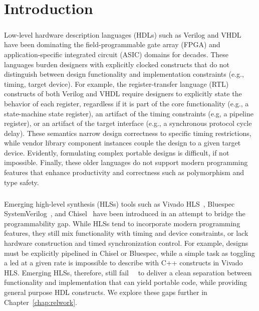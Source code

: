 \chapter{Introduction}
\label{chap:intro}
\paragraph{}Low-level hardware description languages (HDLs) such as Verilog and VHDL have been dominating the field-programmable gate array (FPGA) and application-specific integrated circuit (ASIC) domains for decades.
These languages burden designers with explicitly clocked constructs that do not distinguish between design functionality and implementation constraints (e.g., timing, target device).
For example, the register-transfer language (RTL) constructs of both Verilog and VHDL require designers to explicitly state the behavior of each register, regardless if it is part of the core functionality (e.g., a state-machine state register), an artifact of the timing constraints (e.g, a pipeline register), or an artifact of the target interface (e.g., a synchronous protocol cycle delay).
%
These semantics narrow design correctness to specific timing restrictions, while vendor library component instances couple the design to a given target device. Evidently, formulating complex portable designs is difficult, if not impossible.
%
Finally, these older languages do not support modern programming features that enhance productivity and correctness such as polymorphism and type safety.
   

\paragraph{}Emerging high-level synthesis (HLSs) tools such as Vivado HLS~\cite{Vivado2012}, Bluespec SystemVerilog~\cite{nikhil2004bluespec}, and Chisel~\cite{Bachrach2012} have been introduced in an attempt to bridge the programmability gap.
While HLSs tend to incorporate modern programming features, they still mix functionality with timing and device constraints, or lack hardware construction and timed synchronization control. For example, designs must be explicitly pipelined in Chisel or Bluespec, while a simple task as toggling a led at a given rate is impossible to describe with C++ constructs in Vivado HLS.
Emerging HLSs, therefore, still fail~\cite{martin2009high}~\cite{Bacon2013} to deliver a clean separation between functionality and implementation that can yield portable code, while providing general purpose HDL constructs. We explore these gaps further in Chapter~\ref{chap:relwork}.
  

